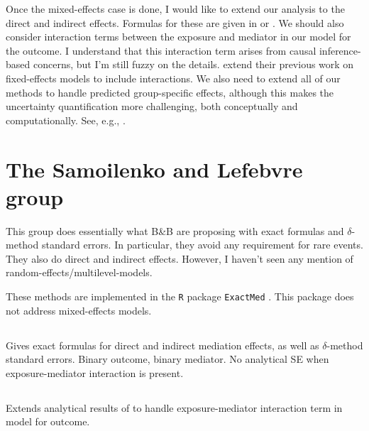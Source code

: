 \documentclass{article}
\begin{document}
Once the mixed-effects case is done, I would like to extend our analysis to the direct and indirect effects. Formulas for these are given in \citet{Sam18} or \citet{Che21}. We should also consider interaction terms between the exposure and mediator in our model for the outcome. I understand that this interaction term arises from causal inference-based concerns, but I'm still fuzzy on the details. \citet{Sam21} extend their previous work on fixed-effects models to include interactions. We also need to extend all of our methods to handle predicted group-specific effects, although this makes the uncertainty quantification more challenging, both conceptually and computationally. See, e.g., \citet{Boo98,Flo19,Zig19}.






\section{The Samoilenko and Lefebvre group}
\label{sec:Sam}

This group does essentially what B\&B are proposing with exact formulas and $\delta$-method standard errors. In particular, they avoid any requirement for rare events. They also do direct and indirect effects. However, I haven't seen any mention of random-effects/multilevel-models.

These methods are implemented in the \texttt{R} package \texttt{ExactMed} \citep{Cau23}. This package does not address mixed-effects models.


\subsection{\citet{Sam18}}

Gives exact formulas for direct and indirect mediation effects, as well as $\delta$-method standard errors. Binary outcome, binary mediator. No analytical SE when exposure-mediator interaction is present.

\subsection{\citet{Sam21}}

Extends analytical results of \citet{Sam18} to handle exposure-mediator interaction term in model for outcome.

\subsection{\citet{Sam23}}
\end{document}
